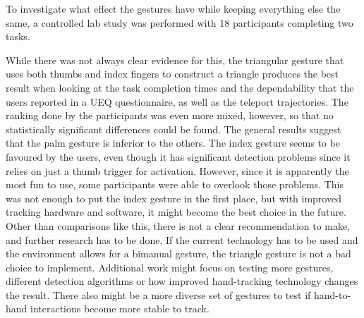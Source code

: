 To investigate what effect the gestures have while keeping everything else the same, a controlled lab study was performed with 18 participants completing two tasks. 

While there was not always clear evidence for this, the triangular gesture that uses both thumbs and index fingers to construct a triangle produces the best result when looking at the task completion times and the dependability that the users reported in a UEQ questionnaire, as well as the teleport trajectories. The ranking done by the participants was even more mixed, however, so that no statistically significant differences could be found. The general results suggest that the palm gesture is inferior to the others. The index gesture seems to be favoured by the users, even though it has significant detection problems since it relies on just a thumb trigger for activation. However, since it is apparently the most fun to use, some participants were able to overlook those problems. This was not enough to put the index gesture in the first place, but with improved tracking hardware and software, it might become the best choice in the future. Other than comparisons like this, there is not a clear recommendation to make, and further research has to be done. If the current technology has to be used and the environment allows for a bimanual gesture, the triangle gesture is not a bad choice to implement. Additional work might focus on testing more gestures, different detection algorithms or how improved hand-tracking technology changes the result. There also might be a more diverse set of gestures to test if hand-to-hand interactions become more stable to track.
